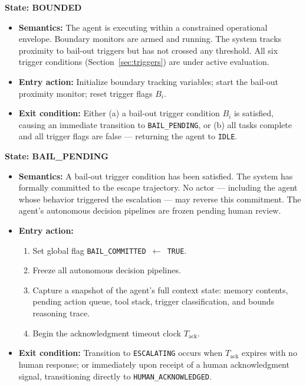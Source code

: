 \bigskip

\noindent\textbf{State: BOUNDED}

\begin{itemize}
  \item \textbf{Semantics:} The agent is executing within a constrained operational envelope. Boundary monitors are armed and running. The system tracks proximity to bail-out triggers but has not crossed any threshold. All six trigger conditions (Section~\ref{sec:triggers}) are under active evaluation.
  \item \textbf{Entry action:} Initialize boundary tracking variables; start the bail-out proximity monitor; reset trigger flags $B_i$.
  \item \textbf{Exit condition:} Either (a) a bail-out trigger condition $B_i$ is satisfied, causing an immediate transition to \texttt{BAIL\_PENDING}, or (b) all tasks complete and all trigger flags are false — returning the agent to \texttt{IDLE}.
\end{itemize}

\bigskip

\noindent\textbf{State: BAIL\_PENDING}

\begin{itemize}
  \item \textbf{Semantics:} A bail-out trigger condition has been satisfied. The system has formally committed to the escape trajectory. No actor — including the agent whose behavior triggered the escalation — may reverse this commitment. The agent's autonomous decision pipelines are frozen pending human review.
  \item \textbf{Entry action:}
    \begin{enumerate}
      \item Set global flag \texttt{BAIL\_COMMITTED $\gets$ TRUE}.
      \item Freeze all autonomous decision pipelines.
      \item Capture a snapshot of the agent's full context state: memory contents, pending action queue, tool stack, trigger classification, and bounds reasoning trace.
      \item Begin the acknowledgment timeout clock $T_{\text{ack}}$.
    \end{enumerate}
  \item \textbf{Exit condition:} Transition to \texttt{ESCALATING} occurs when $T_{\text{ack}}$ expires with no human response; or immediately upon receipt of a human acknowledgment signal, transitioning directly to \texttt{HUMAN\_ACKNOWLEDGED}.
\end{itemize}

